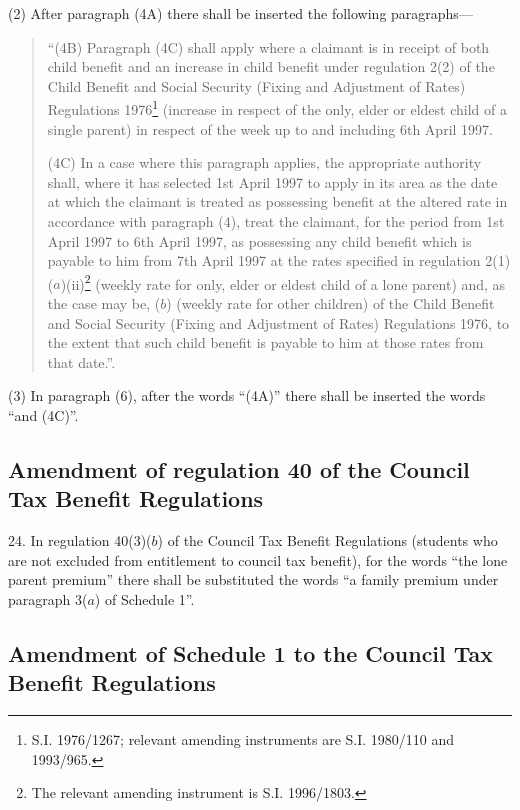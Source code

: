 \documentclass[a4paper]{article}
\begin{document}
(2) After paragraph (4A) there shall be inserted the following paragraphs—
\begin{quotation}
“(4B) Paragraph (4C) shall apply where a claimant is in receipt of both child benefit and an increase in child benefit under regulation 2(2) of the Child Benefit and Social Security (Fixing and Adjustment of Rates) Regulations 1976\footnote{\frenchspacing S.I. 1976/1267; relevant amending instruments are S.I. 1980/110 and 1993/965.} (increase in respect of the only, elder or eldest child of a single parent) in respect of the week up to and including 6th April 1997.

(4C) In a case where this paragraph applies, the appropriate authority shall, where it has selected 1st April 1997 to apply in its area as the date at which the claimant is treated as possessing benefit at the altered rate in accordance with paragraph (4), treat the claimant, for the period from 1st April 1997 to 6th April 1997, as possessing any child benefit which is payable to him from 7th April 1997 at the rates specified in regulation 2(1)($a$)(ii)\footnote{\frenchspacing The relevant amending instrument is S.I. 1996/1803.} (weekly rate for only, elder or eldest child of a lone parent) and, as the case may be, ($b$) (weekly rate for other children) of the Child Benefit and Social Security (Fixing and Adjustment of Rates) Regulations 1976, to the extent that such child benefit is payable to him at those rates from that date.”.
\end{quotation}

(3) In paragraph (6), after the words “(4A)” there shall be inserted the words “and (4C)”.

\subsection[24. Amendment of regulation 40 of the Council Tax Benefit Regulations]{Amendment of regulation 40 of the Council Tax Benefit Regulations}

24.  In regulation 40(3)($b$) of the Council Tax Benefit Regulations (students who are not excluded from entitlement to council tax benefit), for the words “the lone parent premium” there shall be substituted the words “a family premium under paragraph 3($a$) of Schedule 1”.

\subsection[25. Amendment of Schedule 1 to the Council Tax Benefit Regulations]{Amendment of Schedule 1 to the Council Tax Benefit Regulations}
\end{document}
